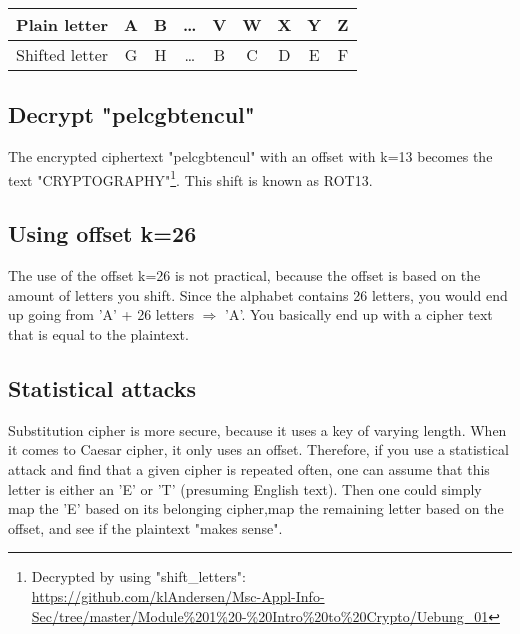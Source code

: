\begin{tabular}{ | c | c | c | c | c | c | c | c | c | } \hline 
	Plain letter	& A & B & \ldots & V & W & X & Y & Z \\ \hline 
	Shifted letter 	& G & H & \ldots & B & C & D & E & F \\ \hline 
\end{tabular}

\subsection{Decrypt "pelcgbtencul"}
\label{section:4b}
The encrypted ciphertext "pelcgbtencul" with an offset with k=13 becomes the text "CRYPTOGRAPHY"\footnote{
	Decrypted by using "shift\_letters": \\ 
	\url{https://github.com/klAndersen/Msc-Appl-Info-Sec/tree/master/Module\%201\%20-\%20Intro\%20to\%20Crypto/Uebung_01}
}. This shift is known as ROT13.

\subsection{Using offset k=26}
\label{section:4c}
The use of the offset k=26 is not practical, because the offset is based on the amount of letters you shift. 
Since the alphabet contains 26 letters, you would end up going from 'A' + 26 letters $\Rightarrow$ 'A'.
You basically end up with a cipher text that is equal to the plaintext. 

\subsection{Statistical attacks}
\label{section:4d}
\begin{comment}
d) When you compare the security of the Caesar cipher to the substitution cipher with respect to statistic attacks, which one is more secure? 
\end{comment}
Substitution cipher is more secure, because it uses a key of varying length. 
When it comes to Caesar cipher, it only uses an offset. 
Therefore, if you use a statistical attack and find that a given cipher is repeated often, one can assume that this letter is either an 'E' or 'T' (presuming English text).
Then one could simply map the 'E' based on its belonging cipher,map the remaining letter based on the offset, and see if the plaintext "makes sense". 

